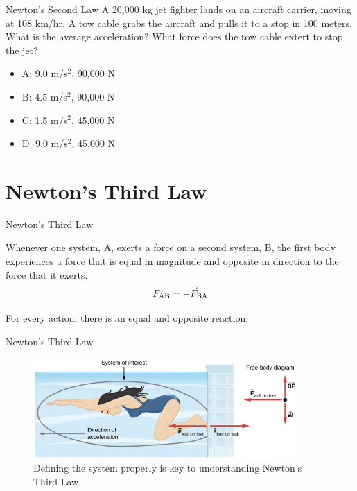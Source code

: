 \documentclass{beamer}
\begin{document}
\begin{frame}{Newton's Second Law}
A 20,000 kg jet fighter lands on an aircraft carrier, moving at 108 km/hr.  A tow cable grabs the aircraft and pulls it to a stop in 100 meters.  What is the average acceleration?  What force does the tow cable extert to stop the jet?
\begin{itemize}
\item A: 9.0 m/s$^2$, 90,000 N
\item B: 4.5 m/s$^2$, 90,000 N
\item C: 1.5 m/s$^2$, 45,000 N
\item D: 9.0 m/s$^2$, 45,000 N
\end{itemize}
\end{frame}

\section{Newton's Third Law}

\begin{frame}{Newton's Third Law}
\begin{tcolorbox}[colback=white,colframe=red!40!blue,title=Newton's Third Law]
\alert{Whenever one system, A, exerts a force on a second system, B, the first body experiences a force that is equal in magnitude and opposite in direction to the force that it exerts.
\begin{equation}
\vec{F}_{\rm AB} = -\vec{F}_{\rm BA}
\end{equation}}
\end{tcolorbox}
For every action, there is an equal and opposite reaction.
\end{frame}

\begin{frame}{Newton's Third Law}
\begin{figure}
\centering
\includegraphics[width=0.9\textwidth]{figures/newtonsthird1.png}
\caption{\label{fig:newtons3} Defining the system properly is key to understanding Newton's Third Law.}
\end{figure}
\end{frame}
\end{document}
